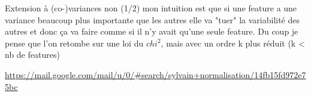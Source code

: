 	
	Extension à (co-)variances non (1/2) 
	mon intuition est que si une feature a une variance beaucoup plus importante que les autres elle va "tuer" la variabilité des autres et donc ça va faire comme si il n'y avait qu'une seule feature.
	Du coup je pense que l'on retombe sur une loi du $chi^2$, mais avec un ordre k plus réduit (k < nb de features)
	
	
	\url{https://mail.google.com/mail/u/0/#search/sylvain+normalisation/14fb15fd972e75bc}


